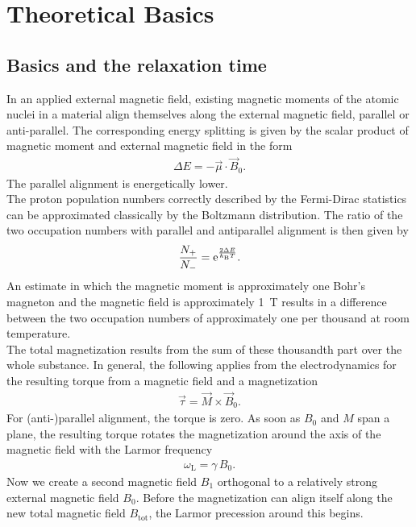 \section{Theoretical Basics}



\subsection{Basics and the relaxation time}
In an applied external magnetic field, existing magnetic moments of the atomic nuclei in a material align themselves along the external magnetic field, parallel or anti-parallel.
The corresponding energy splitting is given by the scalar product of magnetic moment and external magnetic field in the form
\begin{align}
\Delta E=-\vec{\mu}\cdot\vec{B}_0.
\end{align}
The parallel alignment is energetically lower.\\
The proton population numbers correctly described by the Fermi-Dirac statistics can be approximated classically by the Boltzmann distribution.
The ratio of the two occupation numbers with parallel and antiparallel alignment is then given by
\begin{align}
\frac{N_+}{N_-}=\mathrm{e}^{\frac{2\Delta E}{k_\text{B}T}}.
\end{align}
An estimate in which the magnetic moment is approximately one Bohr's magneton and the magnetic field is approximately \SI{1}{\tesla} results in a difference between the two occupation numbers of approximately one per thousand at room temperature.\\
The total magnetization results from the sum of these thousandth part over the whole substance.
In general, the following applies from the electrodynamics for the resulting torque from a magnetic field and a magnetization
\begin{align}
\vec{\tau}=\vec{M}\times\vec{B}_0.
\end{align}
For (anti-)parallel alignment, the torque is zero.
As soon as $B_0$ and $M$ span a plane, the resulting torque rotates the magnetization around the axis of the magnetic field with the Larmor frequency
\begin{align}
\omega_\text{L}=\gamma\,B_0.
\label{eq:lamor}
\end{align}
Now we create a second magnetic field $B_1$ orthogonal to a relatively strong external magnetic field $B_0$.
Before the magnetization can align itself along the new total magnetic field $B_\text{tot}$, the Larmor precession around this begins.
